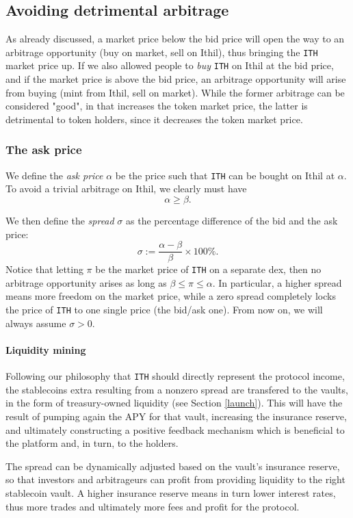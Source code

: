 \documentclass[a4paper,10 pt]{article}
\theoremstyle{definition}
\begin{document}
\subsection{Avoiding detrimental arbitrage}

As already discussed, a market price below the bid price will open the way to an arbitrage opportunity (buy on market, sell on Ithil), thus bringing the \verb|ITH| market price up. If we also allowed people to {\it buy} \verb|ITH| on Ithil at the bid price, and if the market price is above the bid price, an arbitrage opportunity will arise from buying (mint from Ithil, sell on market). While the former arbitrage can be considered "good", in that increases the token market price, the latter is detrimental to token holders, since it decreases the token market price.

\subsubsection{The ask price}
We define the {\it ask price} $\alpha$ be the price such that \verb|ITH| can be bought on Ithil at $\alpha$. To avoid a trivial arbitrage on Ithil, we clearly must have $$\alpha \ge \beta.$$

We then define the {\it spread} $\sigma$ as the percentage difference of the bid and the ask price: $$\sigma := \frac{\alpha-\beta}{\beta} \times 100\%.$$
Notice that letting $\pi$ be the market price of \verb|ITH| on a separate dex, then no arbitrage opportunity arises as long as $\beta \le \pi \le \alpha$. In particular, a higher spread means more freedom on the market price, while a zero spread completely locks the price of \verb|ITH| to one single price (the bid/ask one). From now on, we will always assume $\sigma > 0$.

\paragraph{Liquidity mining}
Following our philosophy that \verb|ITH| should directly represent the protocol income, the stablecoins extra resulting from a nonzero spread are transfered to the vaults, in the form of treasury-owned liquidity (see Section \ref{launch}). This will have the result of pumping again the APY for that vault, increasing the insurance reserve, and ultimately constructing a positive feedback mechanism which is beneficial to the platform and, in turn, to the holders.

The spread can be dynamically adjusted based on the vault's insurance reserve, so that investors and arbitrageurs can profit from providing liquidity to the right stablecoin vault. A higher insurance reserve means in turn lower interest rates, thus more trades and ultimately more fees and profit for the protocol.
\end{document}
